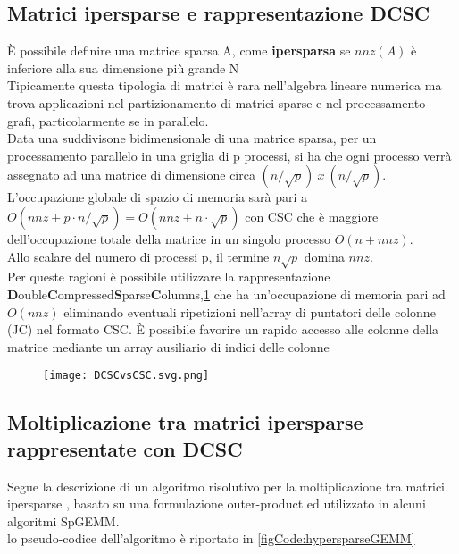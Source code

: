 \subsection{Matrici ipersparse e rappresentazione DCSC}
È possibile definire una matrice sparsa A, come {\bf ipersparsa }se $nnz(A)$ è
inferiore alla sua dimensione più grande N \parencite{2dNewIdeas} \\ %
Tipicamente questa tipologia di matrici è rara nell'algebra lineare numerica ma trova applicazioni
nel partizionamento di matrici sparse e nel processamento grafi, particolarmente se in parallelo.\\

Data una suddivisone bidimensionale di una matrice sparsa, %
per un processamento parallelo in una griglia di p processi, si ha che ogni processo
verrà assegnato ad una matrice di dimensione circa $(n/\sqrt{p})~x~(n/\sqrt{p})$. %
L'occupazione globale di spazio di memoria sarà pari a 
$O(nnz + p \cdot n/\sqrt{p}) = O(nnz + n \cdot \sqrt{p})$ con CSC che è maggiore
dell'occupazione totale della matrice in un singolo processo $O(n + nnz)$.\\
Allo scalare del numero di processi p, il termine $n\sqrt{p}$ domina $nnz$.\\

Per queste ragioni è possibile utilizzare la rappresentazione 
{\bf D}ouble{\bf C}ompressed{\bf S}parse{\bf C}olumns,\ref{fig:DCSCvsCSC}
che ha un'occupazione di memoria pari ad $O(nnz)$
eliminando eventuali ripetizioni nell'array di puntatori delle colonne (JC) nel formato CSC.
È possibile favorire un rapido accesso alle colonne della matrice mediante un
array ausiliario di indici delle colonne \nnz
\begin{figure}[h]
  \caption[confronto delle rappresentazioni DCSC e CSC ]
  \centering \texttt{[image: DCSCvsCSC.svg.png]} \label{fig:DCSCvsCSC}
\end{figure}

\subsection{Moltiplicazione tra matrici ipersparse rappresentate con DCSC}
\label{ssec:hypersparseGEMM}
Segue la descrizione di un algoritmo risolutivo per la moltiplicazione tra matrici
ipersparse \parencite{2dNewIdeas}, basato su una formulazione outer-product ed
utilizzato in alcuni algoritmi SpGEMM.\\
lo pseudo-codice dell'algoritmo è riportato in \ref{figCode:hypersparseGEMM} 


